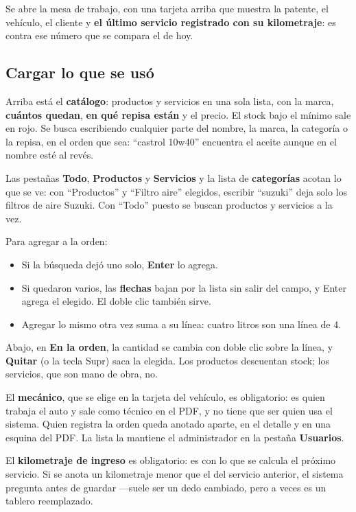 \documentclass[11pt,a4paper]{article}
\begin{document}
Se abre la mesa de trabajo, con una tarjeta arriba que muestra la patente, el
vehículo, el cliente y \textbf{el último servicio registrado con su
kilometraje}: es contra ese número que se compara el de hoy.

\subsection{Cargar lo que se usó}

Arriba está el \textbf{catálogo}: productos y servicios en una sola lista, con
la marca, \textbf{cuántos quedan}, \textbf{en qué repisa están} y el precio. El
stock bajo el mínimo sale en rojo. Se busca escribiendo cualquier parte del
nombre, la marca, la categoría o la repisa, en el orden que sea: ``castrol
10w40'' encuentra el aceite aunque en el nombre esté al revés.

Las pestañas \textbf{Todo}, \textbf{Productos} y \textbf{Servicios} y la lista de
\textbf{categorías} acotan lo que se ve: con ``Productos'' y ``Filtro aire''
elegidos, escribir ``suzuki'' deja solo los filtros de aire Suzuki. Con
``Todo'' puesto se buscan productos y servicios a la vez.

Para agregar a la orden:

\begin{itemize}
  \item Si la búsqueda dejó uno solo, \textbf{Enter} lo agrega.
  \item Si quedaron varios, las \textbf{flechas} bajan por la lista sin salir del
        campo, y Enter agrega el elegido. El doble clic también sirve.
  \item Agregar lo mismo otra vez suma a su línea: cuatro litros son una línea
        de 4.
\end{itemize}

Abajo, en \textbf{En la orden}, la cantidad se cambia con doble clic sobre la
línea, y \textbf{Quitar} (o la tecla Supr) saca la elegida. Los productos
descuentan stock; los servicios, que son mano de obra, no.

El \textbf{mecánico}, que se elige en la tarjeta del vehículo, es obligatorio:
es quien trabaja el auto y sale como
técnico en el PDF, y no tiene que ser quien usa el sistema. Quien registra la
orden queda anotado aparte, en el detalle y en una esquina del PDF. La lista la
mantiene el administrador en la pestaña \textbf{Usuarios}.

El \textbf{kilometraje de ingreso} es obligatorio: es con lo que se calcula el
próximo servicio. Si se anota un kilometraje menor que el del servicio anterior,
el sistema pregunta antes de guardar —suele ser un dedo cambiado, pero a veces
es un tablero reemplazado.
\end{document}
